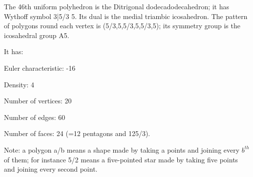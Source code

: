 The 46th uniform polyhedron is the Ditrigonal dodecadodecahedron; it has Wythoff symbol 3|5/3 5. Its dual is the medial triambic icosahedron. The pattern of polygons round each vertex is (5/3,5,5/3,5,5/3,5); its symmetry group is the icosahedral group A5.\par
It has:\par
Euler characteristic: -16\par
Density: 4\par
Number of vertices: 20\par
Number of edges:  60\par
Number of faces: 24 (=12 pentagons and 12{5/3}).\par
Note: a polygon a/b means a shape made by taking a points and joining every $b^{th}$  of them; for instance 5/2 means a five-pointed star made by taking five points and joining every second point.